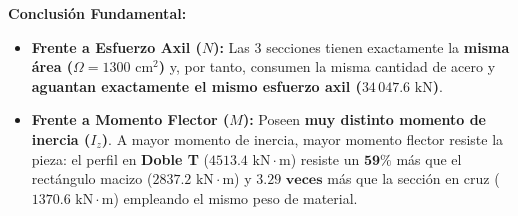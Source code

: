{    

    \begin{tcolorbox}[colback=yellow!10, colframe=orange!85!black, arc=3pt, boxrule=0.8pt]
        \textbf{Conclusión Fundamental:}
        \begin{itemize}
            \item \textbf{Frente a Esfuerzo Axil ($N$):} Las 3 secciones tienen exactamente la \textbf{misma área ($\Omega = 1300\text{ cm}^2$)} y, por tanto, consumen la misma cantidad de acero y \textbf{aguantan exactamente el mismo esfuerzo axil ($34\,047.6\text{ kN}$)}.
            \item \textbf{Frente a Momento Flector ($M$):} Poseen \textbf{muy distinto momento de inercia ($I_z$)}. A mayor momento de inercia, mayor momento flector resiste la pieza: el perfil en \textbf{Doble T} ($4513.4\text{ kN}\cdot\text{m}$) resiste un $\mathbf{59\%}$ más que el rectángulo macizo ($2837.2\text{ kN}\cdot\text{m}$) y $\mathbf{3.29\text{ veces}}$ más que la sección en cruz ($1370.6\text{ kN}\cdot\text{m}$) empleando el mismo peso de material.
        \end{itemize}
    \end{tcolorbox}
}
